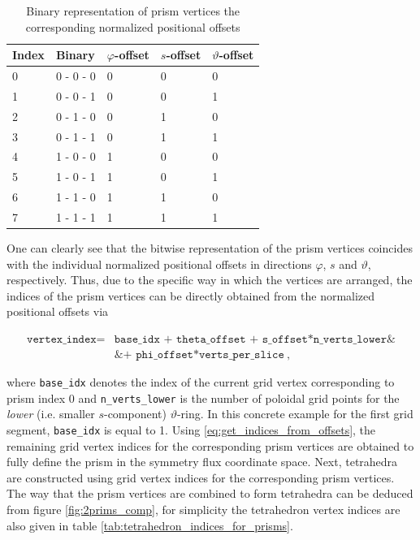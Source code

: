 \documentclass[./main.tex]{subfiles}
\begin{document}
\begin{centering}
	\begin{table}[H]
		\caption{Binary representation of prism vertices the corresponding normalized positional offsets}
		\begin{tabular}{|l|l|l|l|l|}
			\hline
			 \rowcolor{lightgray}
			Index&Binary&$\varphi$-offset &$s$-offset &$\vartheta$-offset \\
			\hline
			0&0 - 0 - 0&0&0&0\\ 
			\hline
			1&0 - 0 - 1&0&0&1\\ 
			\hline 
			2&0 - 1 - 0&0&1&0\\ 
			\hline
			3&0 - 1 - 1&0&1&1\\ 
			\hline
			4&1 - 0 - 0&1&0&0\\ 
			\hline
			5&1 - 0 - 1&1&0&1\\ 
			\hline
			6&1 - 1 - 0&1&1&0\\ 
			\hline
			7&1 - 1 - 1&1&1&1\\ 
			\hline
		\end{tabular}
		\label{tab:binary_prisms}	
	\end{table}
\end{centering}

One can clearly see that the bitwise representation of the prism vertices coincides with the individual normalized positional offsets in directions $\varphi$, $s$ and $\vartheta$, respectively. Thus, due to the specific way in which the vertices are arranged, the indices of the prism vertices can be directly obtained from the normalized positional offsets via

\begin{align}
    \texttt{vertex\_index} =&\texttt{base\_idx + theta\_offset + s\_offset*n\_verts\_lower\&}\label{eq:get_indices_from_offsets}\\
&\texttt{\&+ phi\_offset*verts\_per\_slice}~,\nonumber
\end{align}

where \texttt{base\_idx} denotes the index of the current grid vertex corresponding to prism index 0 and \texttt{n\_verts\_lower} is the number of poloidal grid points for the \textit{lower} (i.e. smaller $s$-component) $\vartheta$-ring. In this concrete example for the first grid segment, \texttt{base\_idx} is equal to 1. 
Using \ref{eq:get_indices_from_offsets}, the remaining grid vertex indices for the corresponding prism vertices are obtained to fully define the prism in the symmetry flux coordinate space. Next, tetrahedra are constructed using grid vertex indices for the corresponding prism vertices. The way that the prism vertices are combined to form tetrahedra can be deduced from figure \ref{fig:2prims_comp}, for simplicity the tetrahedron vertex indices are also given in table \ref{tab:tetrahedron_indices_for_prisms}.
\end{document}
